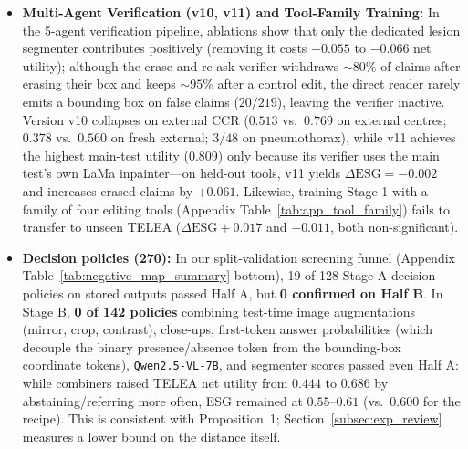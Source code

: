 \documentclass{article} %
\begin{document}
\begin{itemize}[leftmargin=*,nosep]
    \item \textbf{Multi-Agent Verification (v10, v11) and Tool-Family Training:} In the 5-agent verification pipeline, ablations show that only the dedicated lesion segmenter contributes positively (removing it costs $-0.055$ to $-0.066$ net utility); although the erase-and-re-ask verifier withdraws $\sim 80\%$ of claims after erasing their box and keeps $\sim 95\%$ after a control edit, the direct reader rarely emits a bounding box on false claims ($20/219$), leaving the verifier inactive. Version v10 collapses on external CCR ($0.513$ vs.\ $0.769$ on external centres; $0.378$ vs.\ $0.560$ on fresh external; $3/48$ on pneumothorax), while v11 achieves the highest main-test utility ($0.809$) only because its verifier uses the main test's own LaMa inpainter---on held-out tools, v11 yields $\Delta\text{ESG} = -0.002$ and increases erased claims by $+0.061$. Likewise, training Stage 1 with a family of four editing tools (Appendix Table~\ref{tab:app_tool_family}) fails to transfer to unseen TELEA ($\Delta\text{ESG} +0.017$ and $+0.011$, both non-significant).
    \item \textbf{Decision policies (270):} In our split-validation screening funnel (Appendix Table~\ref{tab:negative_map_summary} bottom), 19 of 128 Stage-A decision policies on stored outputs passed Half A, but \textbf{0 confirmed on Half B}. In Stage B, \textbf{0 of 142 policies} combining test-time image augmentations (mirror, crop, contrast), close-ups, first-token answer probabilities (which decouple the binary presence/absence token from the bounding-box coordinate tokens), \texttt{Qwen2.5-VL-7B}, and segmenter scores passed even Half A: while combiners raised TELEA net utility from $0.444$ to $0.686$ by abstaining/referring more often, ESG remained at $0.55\text{--}0.61$ (vs.\ $0.600$ for the recipe). This is consistent with Proposition~1; Section~\ref{subsec:exp_review} measures a lower bound on the distance itself.
\end{itemize}
\end{document}
